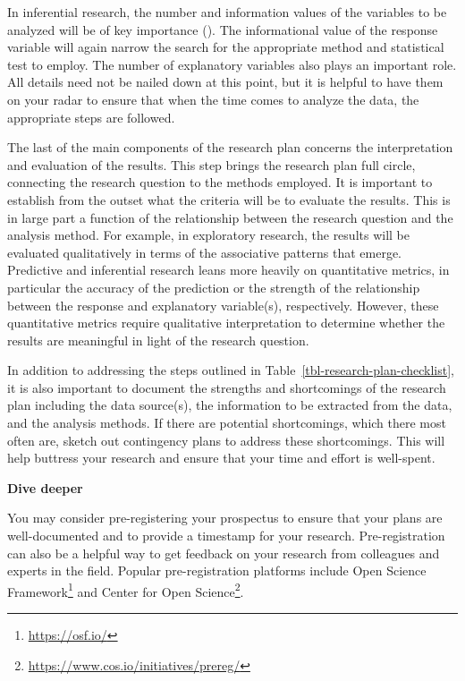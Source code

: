 \documentclass[
  letterpaper,
  krantz1]{latex/krantz-mod}
\theoremstyle{definition}
\theoremstyle{definition}
\theoremstyle{remark}
\DeclareRobustCommand{\href}[2]{#2\footnote{\url{#1}}}
\begin{document}
In inferential research, the
number and information values of the variables to be analyzed will be of
key importance (). The
informational value of the response variable
will again narrow the search for the appropriate method and statistical
test to employ. The number of explanatory variables also plays an
important role. All details need not be nailed down at this point, but
it is helpful to have them on your radar to ensure that when the time
comes to analyze the data, the appropriate steps are followed.

The last of the main components of the research plan concerns the
interpretation and evaluation of the
results. This step brings the research
plan full circle, connecting the research question to the methods
employed. It is important to establish from the outset what the criteria
will be to evaluate the results. This is in large part a function of the
relationship between the research question and the analysis method. For
example, in exploratory research, the results will be evaluated
qualitatively in terms of the associative patterns that emerge.
Predictive and inferential research leans more heavily on quantitative
metrics, in particular the accuracy of the prediction or the strength of
the relationship between the response and explanatory variable(s),
respectively. However, these quantitative metrics require qualitative
interpretation to determine whether the results are meaningful in light
of the research question.

In addition to addressing the steps outlined in
Table~\ref{tbl-research-plan-checklist}, it is also important to
document the strengths and shortcomings of the research plan including
the data source(s), the information to be extracted from the data, and
the analysis methods. If there are potential shortcomings, which there
most often are, sketch out contingency plans to address these
shortcomings. This will help buttress your research and ensure that your
time and effort is well-spent.

\begin{tcolorbox}[enhanced jigsaw, toprule=.15mm, breakable, colback=white, arc=.35mm, left=2mm, colframe=quarto-callout-color-frame, opacityback=0, bottomrule=.15mm, rightrule=.15mm, leftrule=.75mm]

\textbf{ Dive deeper}

You may consider pre-registering your prospectus to ensure that your
plans are well-documented and to provide a timestamp for your research.
Pre-registration can also be a helpful way to get feedback on your
research from colleagues and experts in the field. Popular
pre-registration platforms include \href{https://osf.io/}{Open Science
Framework} and \href{https://www.cos.io/initiatives/prereg/}{Center for
Open Science}.

\end{tcolorbox}
\end{document}
